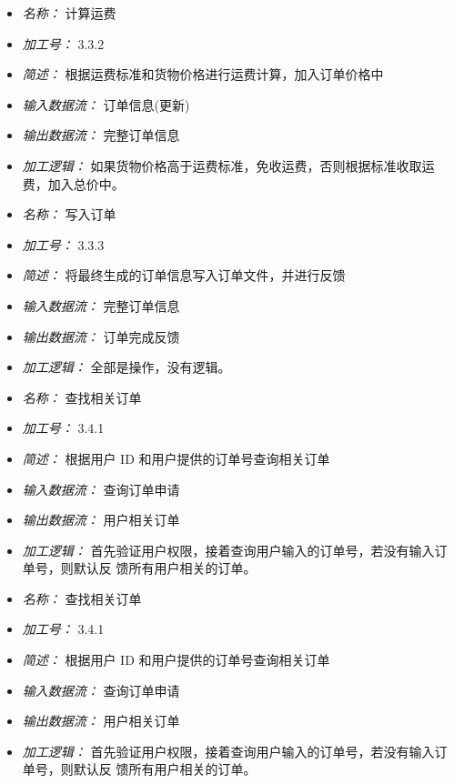 \begin{itemize}
\item \textit{名称： }计算运费
\item \textit{加工号： }3.3.2
\item \textit{简述： }根据运费标准和货物价格进行运费计算，加入订单价格中 
\item \textit{输入数据流： }订单信息(更新)
\item \textit{输出数据流： }完整订单信息 
\item \textit{加工逻辑： }如果货物价格高于运费标准，免收运费，否则根据标准收取运费，加入总价中。

\end{itemize}


\vspace{-1mm}


\begin{itemize}
\item \textit{名称： }写入订单
\item \textit{加工号： }3.3.3 
\item \textit{简述： }将最终生成的订单信息写入订单文件，并进行反馈 
\item \textit{输入数据流： }完整订单信息
\item \textit{输出数据流： }订单完成反馈
\item \textit{加工逻辑： }全部是操作，没有逻辑。

\end{itemize}


\vspace{-1mm}


\begin{itemize}
\item \textit{名称： }查找相关订单
\item \textit{加工号： }3.4.1
\item \textit{简述： }根据用户 ID 和用户提供的订单号查询相关订单
\item \textit{输入数据流： }查询订单申请
\item \textit{输出数据流： }用户相关订单 
\item \textit{加工逻辑： }首先验证用户权限，接着查询用户输入的订单号，若没有输入订单号，则默认反 馈所有用户相关的订单。

\end{itemize}


\vspace{-1mm}


\begin{itemize}
\item \textit{名称： }查找相关订单
\item \textit{加工号： }3.4.1
\item \textit{简述： }根据用户 ID 和用户提供的订单号查询相关订单
\item \textit{输入数据流： }查询订单申请
\item \textit{输出数据流： }用户相关订单 
\item \textit{加工逻辑： }首先验证用户权限，接着查询用户输入的订单号，若没有输入订单号，则默认反 馈所有用户相关的订单。

\end{itemize}


